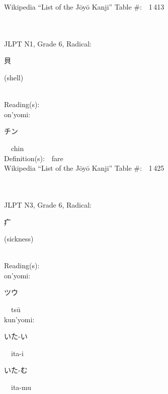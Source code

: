 \begin{multicols}{2}
Wikipedia ``List of the J\=oy\=o Kanji'' Table \#:\ \ 1\,413 \\
\ \ \\
{\fontsize{34pt}{40pt}  }\ \ \\  %
{JLPT N1, Grade 6, Radical:\ \ {\begin{CJK}{UTF8}{min} 貝 \end{CJK}} (shell) } \\
Reading(s):\ \ \\
{\hspace*{1em}}on'yomi:\ \ \\
{\hspace*{2em}}{\begin{CJK}{UTF8}{min} チン \end{CJK}}\ \ chin\ \ \\
Definition(s):\ \ fare \\
Wikipedia ``List of the J\=oy\=o Kanji'' Table \#:\ \ 1\,425 \\
\ \ \\
{\fontsize{34pt}{40pt}  }\ \ \\  %
{JLPT N3, Grade 6, Radical:\ \ {\begin{CJK}{UTF8}{min} 疒 \end{CJK}} (sickness) } \\
Reading(s):\ \ \\
{\hspace*{1em}}on'yomi:\ \ \\
{\hspace*{2em}}{\begin{CJK}{UTF8}{min} ツウ \end{CJK}}\ \ ts\=u\ \ \\
{\hspace*{1em}}kun'yomi:\ \ \\
{\hspace*{2em}}{\begin{CJK}{UTF8}{min} いた-い \end{CJK}}\ \ ita-i\ \ \\
{\hspace*{2em}}{\begin{CJK}{UTF8}{min} いた-む \end{CJK}}\ \ ita-mu\ \ \\

\end{multicols}
